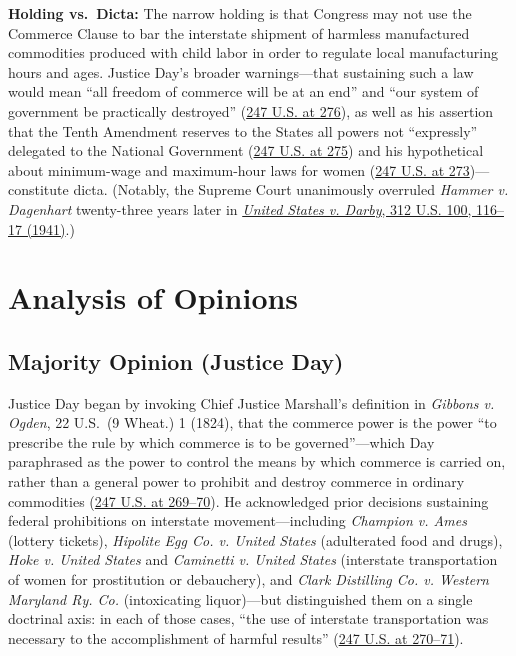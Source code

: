 \documentclass[12pt]{article}
\begin{document}
\textbf{Holding vs.\ Dicta:} The narrow holding is that Congress may not use the Commerce Clause to bar the interstate shipment of harmless manufactured commodities produced with child labor in order to regulate local manufacturing hours and ages. Justice Day's broader warnings---that sustaining such a law would mean ``all freedom of commerce will be at an end'' and ``our system of government be practically destroyed'' (\href{https://supreme.justia.com/cases/federal/us/247/251/}{247 U.S. at 276}), as well as his assertion that the Tenth Amendment reserves to the States all powers not ``expressly'' delegated to the National Government (\href{https://supreme.justia.com/cases/federal/us/247/251/}{247 U.S. at 275}) and his hypothetical about minimum-wage and maximum-hour laws for women (\href{https://supreme.justia.com/cases/federal/us/247/251/}{247 U.S. at 273})---constitute dicta. (Notably, the Supreme Court unanimously overruled \textit{Hammer v. Dagenhart} twenty-three years later in \href{https://supreme.justia.com/cases/federal/us/312/100/}{\textit{United States v. Darby}, 312 U.S. 100, 116--17 (1941)}.)

\section{Analysis of Opinions}

\subsection{Majority Opinion (Justice Day)}
Justice Day began by invoking Chief Justice Marshall's definition in \textit{Gibbons v. Ogden}, 22 U.S.\ (9 Wheat.) 1 (1824), that the commerce power is the power ``to prescribe the rule by which commerce is to be governed''---which Day paraphrased as the power to control the means by which commerce is carried on, rather than a general power to prohibit and destroy commerce in ordinary commodities (\href{https://supreme.justia.com/cases/federal/us/247/251/}{247 U.S. at 269--70}). He acknowledged prior decisions sustaining federal prohibitions on interstate movement---including \textit{Champion v. Ames} (lottery tickets), \textit{Hipolite Egg Co. v. United States} (adulterated food and drugs), \textit{Hoke v. United States} and \textit{Caminetti v. United States} (interstate transportation of women for prostitution or debauchery), and \textit{Clark Distilling Co. v. Western Maryland Ry. Co.} (intoxicating liquor)---but distinguished them on a single doctrinal axis: in each of those cases, ``the use of interstate transportation was necessary to the accomplishment of harmful results'' (\href{https://supreme.justia.com/cases/federal/us/247/251/}{247 U.S. at 270--71}).
\end{document}
